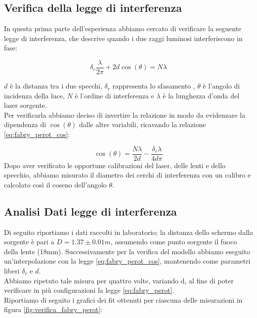 \documentclass[letterpaper,12pt]{article}
\begin{document}
\subsection{Verifica della legge di interferenza}

In questa prima parte dell'esperienza abbiamo cercato di verificare
la seguente legge di interferenza, che descrive quando i due raggi luminosi interferiscono in fase:

\begin{equation}
    \delta_r \frac{\lambda}{2 \pi} + 2d \cos(\theta) = N \lambda
    \label{eq:fabry_perot}
\end{equation}

$d$ è la distanza tra i due specchi, $\delta_r$ rappresenta lo sfasamento , $\theta$ è l'angolo di incidenza della luce, $N$ è l'ordine di interferenza e $\lambda$ 
è la lunghezza d'onda del laser sorgente. \\
Per verificarla abbiamo deciso di invertire la relazione in modo da evidenzare la dipendenza di $\cos(\theta)$ dalle
altre variabili, ricavando la relazione \ref{eq:fabry_perot_cos}:

\begin{equation}
    \cos(\theta) = \frac{N \lambda}{2d} - \frac{\delta_r \lambda}{4 d \pi}
    \label{eq:fabry_perot_cos}
\end{equation}
Dopo aver verificato le opportune calibrazioni del laser, delle lenti e dello specchio,
abbiamo misurato il diametro dei cerchi di interferenza con un calibro e calcolato così il coseno dell'angolo $\theta$.\\

\subsection{Analisi Dati legge di interferenza}
Di seguito riportiamo i dati raccolti in laboratorio; la distanza dello schermo dalla sorgente è pari a $D = 1.37 \pm0.01 m$, assumendo come punto sorgente il fuoco della lente 
(18mm). Successivamente per la verifica del modello abbiamo eseguito un'interpolazione con la legge \ref{eq:fabry_perot_cos}, mantenendo come 
parametri liberi $\delta_r$ e $d$.\\
Abbiamo ripetuto tale misura per quattro volte, variando d, al fine di poter verificare in più configurazioni la 
legge \ref{eq:fabry_perot}.\\
Riportiamo di seguito i grafici dei fit ottenuti per ciascuna delle misurazioni in figura \ref{fig:verifica_fabry_perot}:
\end{document}
